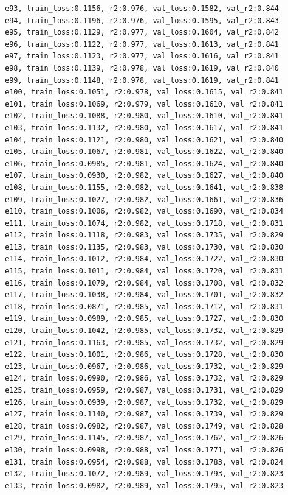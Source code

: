 \documentclass[a4paper, 12pt]{article}
\begin{document}
\begin{lstlisting}
e93, train_loss:0.1156, r2:0.976, val_loss:0.1582, val_r2:0.844
e94, train_loss:0.1196, r2:0.976, val_loss:0.1595, val_r2:0.843
e95, train_loss:0.1129, r2:0.977, val_loss:0.1604, val_r2:0.842
e96, train_loss:0.1122, r2:0.977, val_loss:0.1613, val_r2:0.841
e97, train_loss:0.1123, r2:0.977, val_loss:0.1616, val_r2:0.841
e98, train_loss:0.1139, r2:0.978, val_loss:0.1619, val_r2:0.840
e99, train_loss:0.1148, r2:0.978, val_loss:0.1619, val_r2:0.841
e100, train_loss:0.1051, r2:0.978, val_loss:0.1615, val_r2:0.841
e101, train_loss:0.1069, r2:0.979, val_loss:0.1610, val_r2:0.841
e102, train_loss:0.1088, r2:0.980, val_loss:0.1610, val_r2:0.841
e103, train_loss:0.1132, r2:0.980, val_loss:0.1617, val_r2:0.841
e104, train_loss:0.1121, r2:0.980, val_loss:0.1621, val_r2:0.840
e105, train_loss:0.1067, r2:0.981, val_loss:0.1622, val_r2:0.840
e106, train_loss:0.0985, r2:0.981, val_loss:0.1624, val_r2:0.840
e107, train_loss:0.0930, r2:0.982, val_loss:0.1627, val_r2:0.840
e108, train_loss:0.1155, r2:0.982, val_loss:0.1641, val_r2:0.838
e109, train_loss:0.1027, r2:0.982, val_loss:0.1661, val_r2:0.836
e110, train_loss:0.1006, r2:0.982, val_loss:0.1690, val_r2:0.834
e111, train_loss:0.1074, r2:0.982, val_loss:0.1718, val_r2:0.831
e112, train_loss:0.1118, r2:0.983, val_loss:0.1735, val_r2:0.829
e113, train_loss:0.1135, r2:0.983, val_loss:0.1730, val_r2:0.830
e114, train_loss:0.1012, r2:0.984, val_loss:0.1722, val_r2:0.830
e115, train_loss:0.1011, r2:0.984, val_loss:0.1720, val_r2:0.831
e116, train_loss:0.1079, r2:0.984, val_loss:0.1708, val_r2:0.832
e117, train_loss:0.1038, r2:0.984, val_loss:0.1701, val_r2:0.832
e118, train_loss:0.0871, r2:0.985, val_loss:0.1712, val_r2:0.831
e119, train_loss:0.0989, r2:0.985, val_loss:0.1727, val_r2:0.830
e120, train_loss:0.1042, r2:0.985, val_loss:0.1732, val_r2:0.829
e121, train_loss:0.1163, r2:0.985, val_loss:0.1732, val_r2:0.829
e122, train_loss:0.1001, r2:0.986, val_loss:0.1728, val_r2:0.830
e123, train_loss:0.0967, r2:0.986, val_loss:0.1732, val_r2:0.829
e124, train_loss:0.0990, r2:0.986, val_loss:0.1732, val_r2:0.829
e125, train_loss:0.0959, r2:0.987, val_loss:0.1731, val_r2:0.829
e126, train_loss:0.0939, r2:0.987, val_loss:0.1732, val_r2:0.829
e127, train_loss:0.1140, r2:0.987, val_loss:0.1739, val_r2:0.829
e128, train_loss:0.0982, r2:0.987, val_loss:0.1749, val_r2:0.828
e129, train_loss:0.1145, r2:0.987, val_loss:0.1762, val_r2:0.826
e130, train_loss:0.0998, r2:0.988, val_loss:0.1771, val_r2:0.826
e131, train_loss:0.0954, r2:0.988, val_loss:0.1783, val_r2:0.824
e132, train_loss:0.1072, r2:0.989, val_loss:0.1793, val_r2:0.823
e133, train_loss:0.0982, r2:0.989, val_loss:0.1795, val_r2:0.823

\end{lstlisting}
\end{document}
